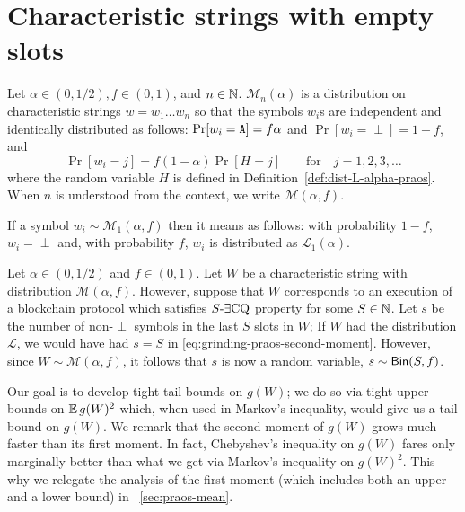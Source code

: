 \section{Characteristic strings with empty slots}\label{sec:praos-empty-slots}
\newcommand{\DistM}{\mathcal{M}}
\newcommand{\DistL}{\mathcal{L}}





\begin{definition}\label{def:dist-M-alpha-f-praos}
  Let $\alpha \in (0,1/2), f \in (0,1)$, and $n \in \NN$. 
  $\DistM_n(\alpha)$ is a distribution on characteristic strings 
  $w = w_1 \ldots w_n$ so that 
  the symbols $w_i$s are independent and identically distributed as follows: 
  $\Pr[w_i = \A] = f \alpha$ and $\Pr[w_i = \perp] = 1-f$, and 
  $$
    \Pr[w_i = j] = f (1-\alpha)\Pr[H = j]
      \qquad \text{for}\quad j = 1,2,3,\ldots
  $$
  where the random variable $H$ is defined in Definition~\ref{def:dist-L-alpha-praos}.
  When $n$ is understood from the context, 
  we write $\DistM(\alpha, f)$. 
\end{definition}
\noindent
If a symbol $w_i \sim \DistM_1(\alpha,f)$ then it means as follows: 
with probability $1-f$, $w_i = \perp$ 
and, with probability $f$, 
$w_i$ is distributed as $\DistL_1(\alpha)$.

Let $\alpha \in (0,1/2)$ and $f \in (0,1)$.
Let $W$ be a characteristic string with distribution $\DistM(\alpha, f)$.
However, suppose that $W$ 
corresponds to an execution of a blockchain protocol 
which satisfies $\sECQ[S]$ property for some $S \in \NN$.
Let $s$ be the number of non-$\perp$ symbols in the last $S$ slots in $W$; 
If $W$ had the distribution $\DistL$, 
we would have had $s = S$  in \eqref{eq:grinding-praos-second-moment}. 
However, since $W \sim \DistM(\alpha, f)$, 
it follows that $s$ is now a random variable, $s \sim \Binomial(S, f)$.



Our goal is to develop tight tail bounds on $g(W)$; 
we do so via tight upper bounds on $\Exp g(W)^2$ 
which, when used in Markov's inequality, 
would give us a tail bound on $g(W)$. 
We remark that the second moment of $g(W)$ grows 
much faster than its first moment. In fact, 
Chebyshev's inequality on $g(W)$ 
fares only marginally better 
than what we get via Markov's inequality on $g(W)^2$. 
This why we relegate the analysis of the first moment 
(which includes both an upper and a lower bound)
in \Section~\ref{sec:praos-mean}.

